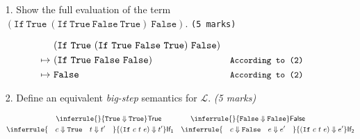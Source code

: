 \documentclass[a4paper,answers]{exam}
\begin{document}
\begin{itemize} 
    \item[1.] Show the full evaluation of the term $(\texttt{If}\ \texttt{True}\ (\texttt{If}\ \texttt{True}\ \texttt{False}\ \texttt{True})\ \texttt{False})$. \texttt{(5 marks)}
\begin{solution}
    \begin{align*}
        &(\texttt{If}\ \texttt{True}\ (\texttt{If}\ \texttt{True}\ \texttt{False}\ \texttt{True})\ \texttt{False})&\\
        \mapsto\ &(\texttt{If}\ \texttt{True}\ \texttt{False}\ \texttt{False})& \small\texttt{According to (2)}\\
        \mapsto\ &\texttt{False}& \small\texttt{According to (2)}
    \end{align*}
\end{solution}

\item[2.] Define an equivalent \emph{big-step} semantics for $\mathcal{L}$. \textit{(5 marks)}
\begin{solution}
    \begin{gather*}
        \inferrule{ }{\texttt{True} \Downarrow \texttt{True}}\mathsf{True} \quad \quad \quad \quad \inferrule{ }{\texttt{False} \Downarrow \texttt{False}}\mathsf{False}\\
        \inferrule{\quad c \Downarrow \texttt{True} \quad t \Downarrow t' \quad}{(\texttt{If}\ c\ t\ e) \Downarrow t'}\mathsf{If_1} \quad  \inferrule{\quad c \Downarrow \texttt{False} \quad e \Downarrow e' \quad}{(\texttt{If}\ c\ t\ e) \Downarrow e'}\mathsf{If_2}
    \end{gather*}
\end{solution}


\end{itemize}
\end{document}
